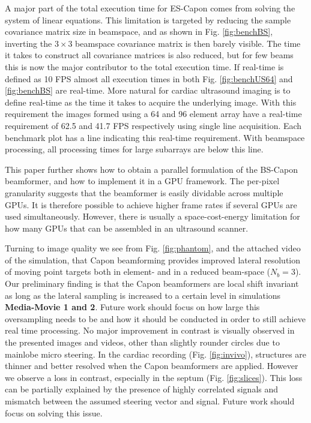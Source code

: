 \documentclass[journal]{IEEEtran}
\newcommand\multimedia[1]{\textbf{{\color{red}#1}}}
\begin{document}
A major part of the total execution time for ES-Capon comes from solving the system of linear equations. This limitation is targeted by reducing the sample covariance matrix size in beamspace, and as shown in Fig. \ref{fig:benchBS}, inverting the $3\times3$ beamspace covariance matrix is then barely visible. The time it takes to construct all covariance matrices is also reduced, but for few beams this is now the major contributor to the total execution time. If real-time is defined as 10 FPS \cite{Chen2011} almost all execution times in both Fig. \ref{fig:benchUS64} and \ref{fig:benchBS} are real-time. More natural for cardiac ultrasound imaging is to define real-time as the time it takes to acquire the underlying image. With this requirement the images formed using a 64 and 96 element array have a real-time requirement of 62.5 and 41.7 FPS respectively using single line acquisition. Each benchmark plot has a line indicating this real-time requirement. With beamspace processing, all processing times for large subarrays are below this line.

This paper further shows how to obtain a parallel formulation of the BS-Capon beamformer, and how to implement it in a GPU framework. The per-pixel granularity suggests that the beamformer is easily dividable across multiple GPUs. It is therefore possible to achieve higher frame rates if several GPUs are used simultaneously. However, there is usually a space-cost-energy limitation for how many GPUs that can be assembled in an ultrasound scanner.
 
Turning to image quality we see from Fig. \ref{fig:phantom}, and the attached video of the simulation, that Capon beamforming provides improved lateral resolution of moving point targets both in element- and in a reduced beam-space ($N_b=3$). Our preliminary finding is that the Capon beamformers are local shift invariant as long as the lateral sampling is increased to a certain level in simulations \multimedia{Media-Movie 1 and 2}. %
Future work should focus on how large this oversampling needs to be and how it should be conducted in order to still achieve real time processing.
No major improvement in contrast is visually observed in the presented images and videos, other than slightly rounder circles due to mainlobe micro steering. In the cardiac recording (Fig. \ref{fig:invivo}), structures are thinner and better resolved when the Capon beamformers are applied. However we observe a loss in contrast, especially in the septum (Fig. \ref{fig:slices}). This loss can be partially explained by the presence of highly correlated signals and mismatch between the assumed steering vector and signal. Future work should focus on solving this issue. 
\end{document}
